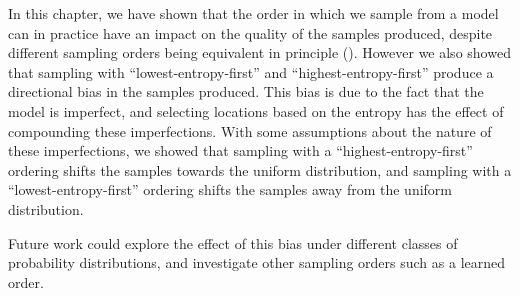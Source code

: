In this chapter, we have shown that the order in which we sample from a model can in practice have an impact on the quality of the samples produced, despite different sampling orders being equivalent in principle (). However we also showed that sampling with ``lowest-entropy-first'' and ``highest-entropy-first'' produce a directional bias in the samples produced. This bias is due to the fact that the model is imperfect, and selecting locations based on the entropy has the effect of compounding these imperfections. With some assumptions about the nature of these imperfections, we showed that sampling with a ``highest-entropy-first'' ordering shifts the samples towards the uniform distribution, and sampling with a ``lowest-entropy-first'' ordering shifts the samples away from the uniform distribution.

Future work could explore the effect of this bias under different classes of probability distributions, and investigate other sampling orders such as a learned order.
